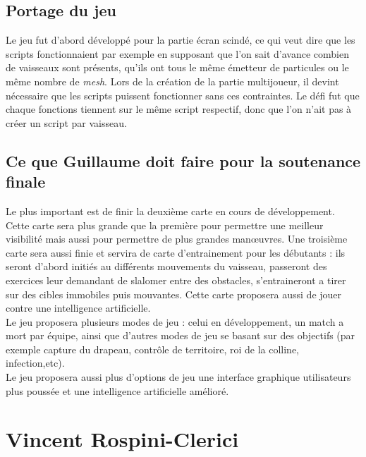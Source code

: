 \documentclass[10pt, titlepage]{report}
\begin{document}
\subsection{Portage du jeu}

Le jeu fut d'abord développé pour la partie écran scindé, ce qui veut dire que les scripts fonctionnaient par exemple en supposant que l'on sait d'avance combien de vaisseaux sont présents, qu'ils ont tous le même émetteur de particules  ou le même nombre de \textit{mesh}. Lors de la création de la partie multijoueur, il devint nécessaire que les scripts puissent fonctionner sans ces contraintes. Le défi fut que chaque fonctions tiennent sur le même script respectif, donc que l'on n'ait pas à créer un script par vaisseau.\\


\subsection{Ce que Guillaume doit faire pour la soutenance finale}

Le plus important est de finir la deuxième carte en cours de développement. Cette carte sera plus grande que la première pour permettre une meilleur visibilité mais aussi pour permettre de plus grandes manœuvres. Une troisième carte sera aussi finie et servira de  carte d'entrainement pour les débutants : ils seront d'abord initiés au différents mouvements du vaisseau, passeront des exercices leur demandant de slalomer entre des obstacles, s'entraineront a tirer sur des cibles immobiles puis mouvantes. Cette carte proposera aussi de jouer contre une intelligence artificielle.\\

Le jeu proposera plusieurs modes de jeu : celui en développement, un match a mort par équipe, ainsi que d'autres modes de jeu se basant sur des objectifs (par exemple capture du drapeau, contrôle de territoire, roi de la colline, infection,etc).\\

Le jeu proposera aussi plus d'options de jeu une interface graphique utilisateurs plus poussée et une intelligence artificielle amélioré.\\

\section{Vincent Rospini-Clerici}
\end{document}
